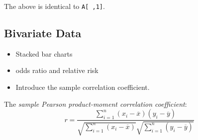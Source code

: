 \documentclass[]{book}
\providecommand{\tightlist}{%
  \setlength{\itemsep}{0pt}\setlength{\parskip}{0pt}}
\numberwithin{equation}{chapter}
\numberwithin{figure}{chapter}
\theoremstyle{plain}
\theoremstyle{definition}
\theoremstyle{remark}
\theoremstyle{definition}
\theoremstyle{definition}
\theoremstyle{remark}
\begin{document}
The above is identical to \texttt{A{[}\ ,1{]}}.

\subsection{Bivariate Data}\label{sub-bivariate-data}

\begin{itemize}
\tightlist
\item
  Stacked bar charts
\item
  odds ratio and relative risk
\item
  Introduce the sample correlation coefficient.
\end{itemize}

The \emph{sample Pearson product-moment correlation coefficient}: \[
r=\frac{\sum_{i=1}^{n}(x_{i}-\overline{x})(y_{i}-\overline{y})}{\sqrt{\sum_{i=1}^{n}(x_{i}-\overline{x})}\sqrt{\sum_{i=1}^{n}(y_{i}-\overline{y})}}
\]
\end{document}
